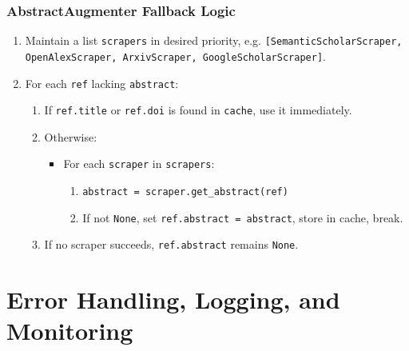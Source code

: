 \documentclass[12pt]{article}
\begin{document}
\subsubsection{AbstractAugmenter Fallback Logic}
\begin{enumerate}
  \item Maintain a list \texttt{scrapers} in desired priority, e.g. \texttt{[SemanticScholarScraper, OpenAlexScraper, ArxivScraper, GoogleScholarScraper]}.
  \item For each \texttt{ref} lacking \texttt{abstract}:
    \begin{enumerate}
      \item If \texttt{ref.title} or \texttt{ref.doi} is found in \texttt{cache}, use it immediately.
      \item Otherwise:
        \begin{itemize}
          \item For each \texttt{scraper} in \texttt{scrapers}:
            \begin{enumerate}
              \item \texttt{abstract = scraper.get\_abstract(ref)}
              \item If not \texttt{None}, set \texttt{ref.abstract = abstract}, store in cache, break.
            \end{enumerate}
        \end{itemize}
      \item If no scraper succeeds, \texttt{ref.abstract} remains \texttt{None}.
    \end{enumerate}
\end{enumerate}


\section{Error Handling, Logging, and Monitoring}
\end{document}
